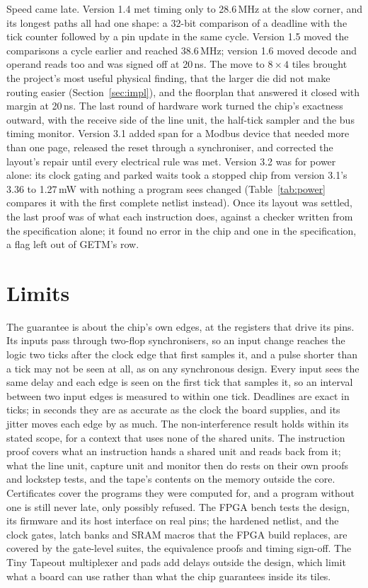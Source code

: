 \documentclass[conference,letterpaper]{IEEEtran}
\begin{document}
Speed came late. Version 1.4 met timing only to 28.6\,MHz at the slow corner, and its
longest paths all had one shape: a 32-bit comparison of a deadline with the tick counter
followed by a pin update in the same cycle. Version 1.5 moved the comparisons a cycle
earlier and reached 38.6\,MHz; version 1.6 moved decode and operand reads too and was
signed off at 20\,ns. The move to $8\times4$ tiles brought the project's most useful
physical finding, that the larger die did not make routing easier (Section~\ref{sec:impl}),
and the floorplan that answered it closed with margin at 20\,ns. The last
round of hardware work turned the chip's exactness outward, with the receive side of the
line unit, the half-tick sampler and the bus timing monitor. Version 3.1 added span for a
Modbus device that needed more than one page, released the reset through a synchroniser,
and corrected the layout's repair until every electrical rule was met. Version 3.2 was for
power alone: its clock gating and parked waits took a stopped chip from version 3.1's
3.36 to 1.27\,mW with nothing a program sees changed (Table~\ref{tab:power} compares it
with the first complete netlist instead). Once its layout was settled, the last proof was of
what each instruction does, against a checker written from the specification alone; it
found no error in the chip and one in the specification, a flag left out of GETM's row.

\section{Limits}
\label{sec:limits}

The guarantee is about the chip's own edges, at the registers that drive its pins. Its
inputs pass through two-flop synchronisers, so an input change reaches the logic two ticks
after the clock edge that first samples it, and a pulse shorter than a tick may not be
seen at all, as on any synchronous design. Every input sees the same delay and each edge
is seen on the first tick that samples it, so an interval between two input edges is
measured to within one tick. Deadlines are exact in ticks; in seconds they are as accurate
as the clock the board supplies, and its jitter moves each edge by as much. The non-interference result holds within its stated scope, for a
context that uses none of the shared units. The instruction proof covers what an
instruction hands a shared unit and reads back from it; what the line unit, capture unit
and monitor then do rests on their own proofs and lockstep tests, and the tape's contents
on the memory outside the core. Certificates cover the programs they were
computed for, and a program without one is still never late, only possibly refused. The
FPGA bench tests the design, its firmware and its host interface on real pins; the
hardened netlist, and the clock gates, latch banks and SRAM macros that the FPGA build
replaces, are covered by the gate-level suites, the equivalence proofs and timing sign-off.
The Tiny Tapeout multiplexer and pads add delays outside the design, which limit what a
board can use rather than what the chip guarantees inside its tiles.
\end{document}
